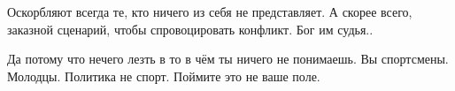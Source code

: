 \begin{itemize}
Оскорбляют всегда те, кто ничего из себя не представляет. А скорее всего,
заказной сценарий, чтобы спровоцировать конфликт. Бог им судья..


 

Да потому что нечего лезть в то в чём ты ничего не понимаешь. Вы спортсмены.
Молодцы. Политика не спорт. Поймите это не ваше поле.

\end{itemize}

